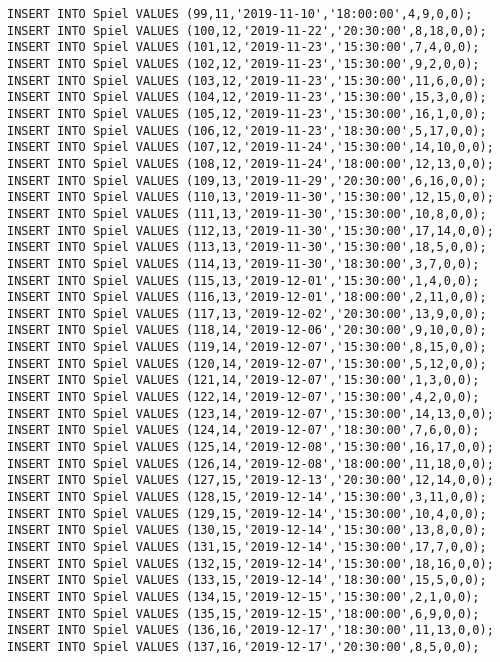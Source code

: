 \documentclass{bschlangaul-aufgabe}
\begin{document}
\begin{verbatim}
INSERT INTO Spiel VALUES (99,11,'2019-11-10','18:00:00',4,9,0,0);
INSERT INTO Spiel VALUES (100,12,'2019-11-22','20:30:00',8,18,0,0);
INSERT INTO Spiel VALUES (101,12,'2019-11-23','15:30:00',7,4,0,0);
INSERT INTO Spiel VALUES (102,12,'2019-11-23','15:30:00',9,2,0,0);
INSERT INTO Spiel VALUES (103,12,'2019-11-23','15:30:00',11,6,0,0);
INSERT INTO Spiel VALUES (104,12,'2019-11-23','15:30:00',15,3,0,0);
INSERT INTO Spiel VALUES (105,12,'2019-11-23','15:30:00',16,1,0,0);
INSERT INTO Spiel VALUES (106,12,'2019-11-23','18:30:00',5,17,0,0);
INSERT INTO Spiel VALUES (107,12,'2019-11-24','15:30:00',14,10,0,0);
INSERT INTO Spiel VALUES (108,12,'2019-11-24','18:00:00',12,13,0,0);
INSERT INTO Spiel VALUES (109,13,'2019-11-29','20:30:00',6,16,0,0);
INSERT INTO Spiel VALUES (110,13,'2019-11-30','15:30:00',12,15,0,0);
INSERT INTO Spiel VALUES (111,13,'2019-11-30','15:30:00',10,8,0,0);
INSERT INTO Spiel VALUES (112,13,'2019-11-30','15:30:00',17,14,0,0);
INSERT INTO Spiel VALUES (113,13,'2019-11-30','15:30:00',18,5,0,0);
INSERT INTO Spiel VALUES (114,13,'2019-11-30','18:30:00',3,7,0,0);
INSERT INTO Spiel VALUES (115,13,'2019-12-01','15:30:00',1,4,0,0);
INSERT INTO Spiel VALUES (116,13,'2019-12-01','18:00:00',2,11,0,0);
INSERT INTO Spiel VALUES (117,13,'2019-12-02','20:30:00',13,9,0,0);
INSERT INTO Spiel VALUES (118,14,'2019-12-06','20:30:00',9,10,0,0);
INSERT INTO Spiel VALUES (119,14,'2019-12-07','15:30:00',8,15,0,0);
INSERT INTO Spiel VALUES (120,14,'2019-12-07','15:30:00',5,12,0,0);
INSERT INTO Spiel VALUES (121,14,'2019-12-07','15:30:00',1,3,0,0);
INSERT INTO Spiel VALUES (122,14,'2019-12-07','15:30:00',4,2,0,0);
INSERT INTO Spiel VALUES (123,14,'2019-12-07','15:30:00',14,13,0,0);
INSERT INTO Spiel VALUES (124,14,'2019-12-07','18:30:00',7,6,0,0);
INSERT INTO Spiel VALUES (125,14,'2019-12-08','15:30:00',16,17,0,0);
INSERT INTO Spiel VALUES (126,14,'2019-12-08','18:00:00',11,18,0,0);
INSERT INTO Spiel VALUES (127,15,'2019-12-13','20:30:00',12,14,0,0);
INSERT INTO Spiel VALUES (128,15,'2019-12-14','15:30:00',3,11,0,0);
INSERT INTO Spiel VALUES (129,15,'2019-12-14','15:30:00',10,4,0,0);
INSERT INTO Spiel VALUES (130,15,'2019-12-14','15:30:00',13,8,0,0);
INSERT INTO Spiel VALUES (131,15,'2019-12-14','15:30:00',17,7,0,0);
INSERT INTO Spiel VALUES (132,15,'2019-12-14','15:30:00',18,16,0,0);
INSERT INTO Spiel VALUES (133,15,'2019-12-14','18:30:00',15,5,0,0);
INSERT INTO Spiel VALUES (134,15,'2019-12-15','15:30:00',2,1,0,0);
INSERT INTO Spiel VALUES (135,15,'2019-12-15','18:00:00',6,9,0,0);
INSERT INTO Spiel VALUES (136,16,'2019-12-17','18:30:00',11,13,0,0);
INSERT INTO Spiel VALUES (137,16,'2019-12-17','20:30:00',8,5,0,0);

\end{verbatim}
\end{document}
